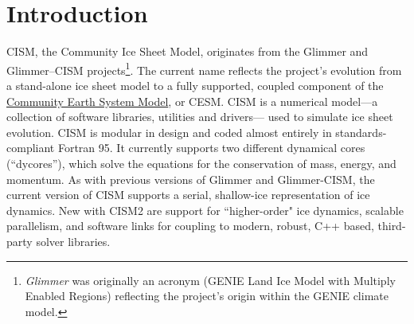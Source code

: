 
\section{Introduction}
%
CISM, the Community Ice Sheet Model, originates from the Glimmer and Glimmer--CISM 
projects\footnote{{\it Glimmer} was originally an acronym (GENIE Land Ice Model with Multiply Enabled Regions)
reflecting the project's origin within the GENIE climate model.}.
The current name reflects
the project's evolution from a stand-alone ice sheet model to a fully supported, 
coupled component of the \href{http://www2.cesm.ucar.edu/}{Community Earth System Model}, or CESM. 
CISM is a numerical model---a collection of software libraries, utilities and drivers---
 used to simulate ice sheet evolution. CISM is modular in design and coded almost 
entirely in standards-compliant Fortran 95. It currently supports two different 
dynamical cores (``dycores''), which solve the equations for the conservation of mass, energy, and momentum. 
As with previous versions of Glimmer and Glimmer-CISM, the current version of CISM 
supports a serial, shallow-ice representation of ice dynamics. 
New with CISM2 are support for ``higher-order" ice dynamics, scalable parallelism, 
and software links for coupling to modern, robust, C++ based, third-party solver libraries. 

%
